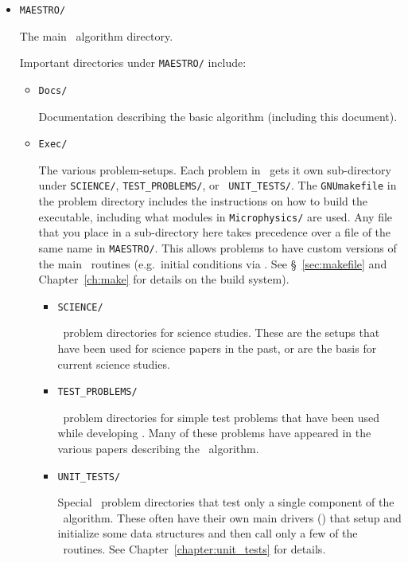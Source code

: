 \begin{itemize}

\item {\tt MAESTRO/}

  The main \maestro\ algorithm directory.  

  Important directories under {\tt MAESTRO/} include:

  \begin{itemize}

  \item {\tt Docs/}

    Documentation describing the basic algorithm (including this
    document).

  \item {\tt Exec/}

    The various problem-setups.  Each problem in \maestro\ gets it own
    sub-directory under {\tt SCIENCE/}, {\tt TEST\_PROBLEMS/}, or {\tt
      UNIT\_TESTS/}.  The {\tt GNUmakefile} in the problem directory
    includes the instructions on how to build the executable,
    including what modules in {\tt Microphysics/} are used.  Any file that
    you place in a sub-directory here takes precedence over a file of
    the same name in {\tt MAESTRO/}.  This allows problems to have
    custom versions of the main \maestro\ routines (e.g.\ initial
    conditions via .  See \S~\ref{sec:makefile} and
    Chapter~\ref{ch:make} for details on the build system).

 
    \begin{itemize}
    \item {\tt SCIENCE/}

      \maestro\ problem directories for science studies.  These are
      the setups that have been used for science papers in the past,
      or are the basis for current science studies.

    \item {\tt TEST\_PROBLEMS/}
 
      \maestro\ problem directories for simple test problems that have
      been used while developing \maestro.  Many of these problems
      have appeared in the various papers describing the
      \maestro\ algorithm.

    \item {\tt UNIT\_TESTS/}

      Special \maestro\ problem directories that test only a single
      component of the \maestro\ algorithm.  These often have their
      own main drivers () that setup and initialize
      some data structures and then call only a few of the
      \maestro\ routines.  See Chapter~\ref{chapter:unit_tests} for details.


\end{itemize}
\end{itemize}
\end{itemize}
